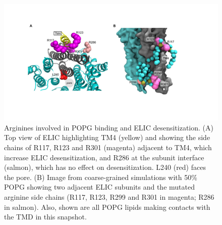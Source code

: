\begin{figure}
\includegraphics[width=\linewidth]{./pandoc_test/media/image10.pdf}
\caption[Arginines involved in POPG binding and ELIC desensitization.] {Arginines involved in POPG binding and ELIC desensitization. (A) Top view of ELIC highlighting TM4 (yellow) and showing the side chains of R117, R123 and R301 (magenta) adjacent to TM4, which increase ELIC desensitization, and R286 at the subunit interface (salmon), which has no effect on desensitization. L240 (red) faces the pore. (B) Image from coarse-grained simulations with 50\% POPG showing two adjacent ELIC subunits and the mutated arginine side chains (R117, R123, R299 and R301 in magenta; R286 in salmon). Also, shown are all POPG lipids making contacts with the TMD in this snapshot.} \label{fig:eleven}
\end{figure}

